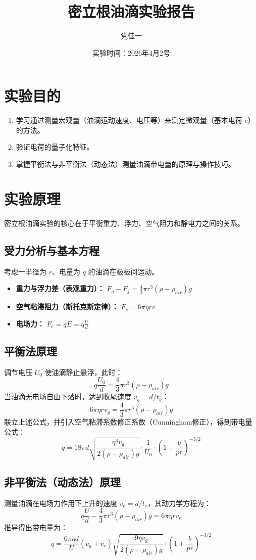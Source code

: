 \documentclass[12pt,a4paper]{article}
\title{\textbf{密立根油滴实验报告}}
\author{党佳一 \quad 202511101093 }
\date{实验时间：2026年4月2号}
\begin{document}
	
	\maketitle
	
	\section{实验目的}
	\begin{enumerate}
		\item 学习通过测量宏观量（油滴运动速度、电压等）来测定微观量（基本电荷 $e$）的方法。
		\item 验证电荷的量子化特征。
		\item 掌握平衡法与非平衡法（动态法）测量油滴带电量的原理与操作技巧。
	\end{enumerate}
	
	\section{实验原理}
	密立根油滴实验的核心在于平衡重力、浮力、空气阻力和静电力之间的关系。
	
	\subsection{受力分析与基本方程}
	考虑一半径为 $r$、电量为 $q$ 的油滴在极板间运动。
	\begin{itemize}
		\item \textbf{重力与浮力差（表观重力）：} $F_g - F_f = \frac{4}{3}\pi r^3 (\rho - \rho_{air})g$
		\item \textbf{空气粘滞阻力（斯托克斯定律）：} $F_s = 6\pi \eta r v$
		\item \textbf{电场力：} $F_e = qE = q\frac{U}{d}$
	\end{itemize}
	
	\subsection{平衡法原理}
	调节电压 $U_0$ 使油滴静止悬浮，此时：
	$$q\frac{U_0}{d} = \frac{4}{3}\pi r^3 (\rho - \rho_{air})g$$
	当油滴无电场自由下落时，达到收尾速度 $v_g = d/t_g$：
	$$6\pi \eta r v_g = \frac{4}{3}\pi r^3 (\rho - \rho_{air})g$$
	联立上述公式，并引入空气粘滞系数修正系数（Cunningham修正），得到带电量公式：
	$$q = 18\pi d \sqrt{\frac{\eta^3 v_g}{2(\rho - \rho_{air})g}} \cdot \frac{1}{U_0} \cdot \left(1 + \frac{b}{pr}\right)^{-3/2}$$
	
	\subsection{非平衡法（动态法）原理}
	测量油滴在电场力作用下上升的速度 $v_e = d/t_e$，其动力学方程为：
	$$q\frac{U}{d} - \frac{4}{3}\pi r^3 (\rho - \rho_{air})g = 6\pi \eta r v_e$$
	推导得出带电量为：
	$$q = \frac{6\pi \eta d}{U} (v_g + v_e) \sqrt{\frac{9\eta v_g}{2(\rho - \rho_{air})g}} \cdot \left(1 + \frac{b}{pr}\right)^{-3/2}$$
	
\end{document}
